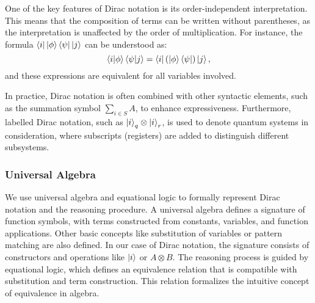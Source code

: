 One of the key features of Dirac notation is its order-independent interpretation. This means that the composition of terms can be written without parentheses, as the interpretation is unaffected by the order of multiplication. For instance, the formula \( \bra{i}\ket{\phi}\bra{\psi}\ket{j} \) can be understood as:
\[
    \braket{i|\phi}\braket{\psi|j} = \bra{i} (\ket{\phi}\bra{\psi}) \ket{j},
\]
and these expressions are equivalent for all variables involved.

In practice, Dirac notation is often combined with other syntactic elements, such as the summation symbol \( \sum_{i \in S} A \), to enhance expressiveness. Furthermore, labelled Dirac notation, such as \( \ket{i}_q \otimes \ket{i}_r \), is used to denote quantum systems in consideration, where subscripts (registers) are added to distinguish different subsystems.

\subsubsection{Universal Algebra}
We use universal algebra and equational logic to formally represent Dirac notation and the reasoning procedure. A universal algebra defines a signature of function symbols, with terms constructed from constants, variables, and function applications. 
Other basic concepts like substitution of variables or pattern matching are also defined.
In our case of Dirac notation, the signature consists of constructors and operations like $\ket{i}$ or $A \otimes B$.
The reasoning process is guided by equational logic, which defines an equivalence relation that is compatible with substitution and term construction. This relation formalizes the intuitive concept of equivalence in algebra.

